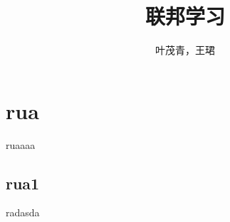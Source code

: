 \documentclass[10pt,twocolumn,letterpaper]{article}
\begin{document}
    \title{联邦学习}
    \author{叶茂青，王珺}

    \maketitle

    \section{rua}
    ruaaaa\cite{li2019federated}
    \subsection{rua1}
    radasda

    {\small
        
        
    }
\end{document}
